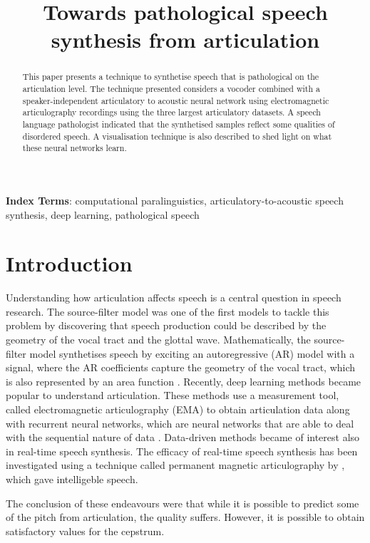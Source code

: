 \documentclass[a4paper]{article}
\title{Towards pathological speech synthesis from articulation}
\begin{document}
\maketitle
% 
\begin{abstract}

  This paper presents a technique to synthetise speech that is pathological on the articulation level.
  The technique presented considers a vocoder combined with a speaker-independent articulatory to acoustic neural network using electromagnetic articulography recordings using the three largest articulatory datasets. A speech language pathologist indicated that the synthetised samples reflect some qualities of disordered speech. A visualisation technique is also described to shed light on what these neural networks learn.
\end{abstract}
\noindent\textbf{Index Terms}: computational paralinguistics, articulatory-to-acoustic
speech synthesis, deep learning, pathological speech

\section{Introduction}
Understanding how articulation affects speech is a central question in speech
research. The source-filter model was one of the first models to tackle this
problem by discovering that speech production could be described by
the geometry of the vocal tract and the glottal wave. Mathematically,
the source-filter model synthetises speech by exciting an autoregressive (AR) model with a
signal, where the AR coefficients capture the geometry of the
vocal tract, which is also represented by an area function \cite{Benesty2009} \cite{Fant1981}.
Recently, deep learning methods became popular
to understand articulation. These methods use a measurement tool,
called electromagnetic articulography (EMA) to obtain articulation data 
\cite{Aryal2016} \cite{Taguchi} \cite{Liu2018} along with recurrent
neural networks, which are neural networks that are able to deal with
the sequential nature of data \cite{Hochreiter1997}. Data-driven methods became of interest also
in real-time speech synthesis. The efficacy of real-time speech synthesis
has been investigated using a technique called permanent magnetic articulography
by \cite{Gonzalez2017}, which gave intelligeble
speech.

The conclusion of these endeavours were that while it is possible to
predict some of the pitch from articulation, the quality suffers.
However, it is possible to obtain satisfactory values for the
cepstrum.
\end{document}
